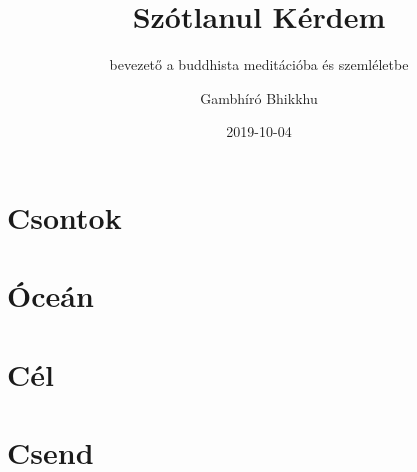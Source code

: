 \documentclass[
  final,
  babelLanguage=hungarian,
  desktopVersion,
]{anecdote}
\title{Szótlanul Kérdem}
\subtitle{bevezető a buddhista meditációba és szemléletbe}
\author{Gambhíró Bhikkhu}
\date{2019-10-04}
\begin{document}
\frontmatter




%
%
%

\cleartorecto
\tableofcontents*

%

%

\mainmatter





%
%

\chapter{Csontok}

\chapter{Óceán}

\chapter{Cél}

\chapter{Csend}

\backmatter

%

%

\emptyUntilEven
\end{document}
